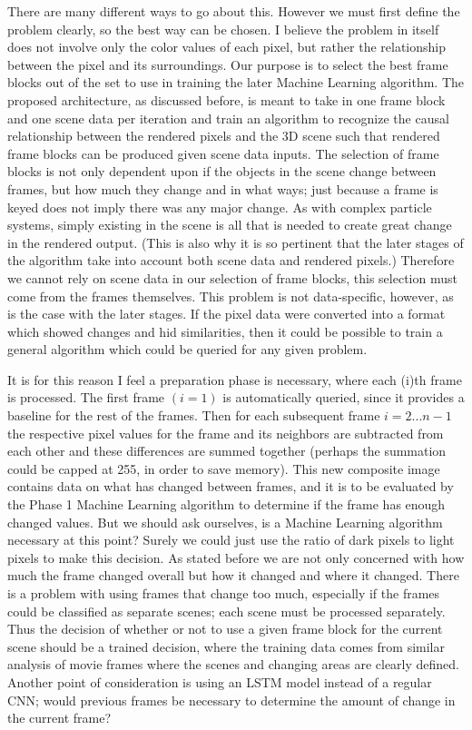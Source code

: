 \documentclass[conference]{IEEEtran}
\begin{document}
There are many different ways to go about this.
However we must first define the problem clearly, so the best way can be chosen.
I believe the problem in itself does not involve only the color values of each pixel,
but rather the relationship between the pixel and its surroundings.
Our purpose is to select the best frame blocks out of the set to use in training the later Machine Learning algorithm.
The proposed architecture, as discussed before,
is meant to take in one frame block and one scene data per iteration and train an algorithm
to recognize the causal relationship between the rendered pixels and the 3D
scene such that rendered frame blocks can be produced given scene data inputs.
The selection of frame blocks is not only dependent upon if the objects in the scene change between frames,
but how much they change and in what ways; just because a frame is keyed does not imply there was any major change.
As with complex particle systems, simply existing in the scene is all that is needed to create great change in the rendered output.
(This is also why it is so pertinent that the later stages of the algorithm take into account both scene data and rendered pixels.)
Therefore we cannot rely on scene data in our selection of frame blocks,
this selection must come from the frames themselves. This problem is not data-specific,
however, as is the case with the later stages.
If the pixel data were converted into a format which showed changes and hid similarities,
then it could be possible to train a general algorithm which could be queried for any given problem.

It is for this reason I feel a preparation phase is necessary, where each (i)th frame is processed.
The first frame $(i=1)$ is automatically queried, since it provides a baseline for the rest of the frames.
Then for each subsequent frame $i=2...n-1$ the respective pixel values for the frame and its neighbors
are subtracted from each other and these differences are summed together (perhaps the summation could be capped at 255, in order to save memory).
This new composite image contains data on what has changed between frames,
and it is to be evaluated by the Phase 1 Machine Learning algorithm to determine if the frame has enough changed values.
But we should ask ourselves, is a Machine Learning algorithm necessary at this point?
Surely we could just use the ratio of dark pixels to light pixels to make this decision.
As stated before we are not only concerned with how much the frame changed overall but how it changed and where it changed.
There is a problem with using frames that change too much, especially if the frames could be classified as separate scenes;
each scene must be processed separately.
Thus the decision of whether or not to use a given frame block for the current scene should be a trained decision,
where the training data comes from similar analysis of movie frames where the scenes and changing areas are clearly defined.
Another point of consideration is using an LSTM model instead of a regular CNN;
would previous frames be necessary to determine the amount of change in the current frame?
\end{document}
